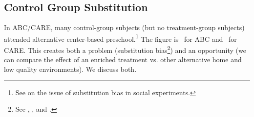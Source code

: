 \subsection{Control Group Substitution}

In ABC/CARE, many control-group subjects (but no treatment-group subjects) attended alternative center-based preschool.\footnote{See \cite{Heckman_Hohmann_etal_2000_QJE} on the issue of substitution bias in social experiments.} The figure is \treatsubsabc\ for ABC and \treatsubscarec\ for CARE. This creates both a problem (substitution bias\footnote{See \cite{Heckman_1992_randomization}, \cite{Heckman_Hohmann_etal_2000_QJE}, and \cite{Kline_Walters_2016_QJE}.}) and an opportunity (we can compare the effect of an enriched treatment vs. other alternative home and low quality environments). We discuss both.

